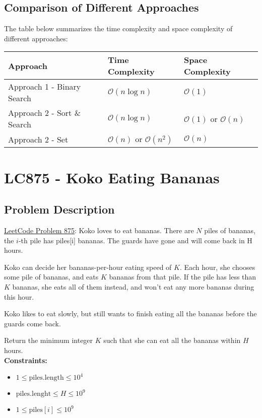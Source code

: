 \documentclass[justified]{tufte-book}
\begin{document}
\subsection{Comparison of Different Approaches}
The table below summarizes the time complexity and space complexity of different approaches:
\begin{table}[ht]
  \centering
  \begin{tabular}{p{5cm}ll}
    \toprule
    Approach & Time Complexity & Space Complexity \\
    \midrule
    Approach 1 - Binary Search &  $\mathcal{O}(n\log n)$ & $\mathcal{O}(1)$\\
    Approach 2 - Sort \& Search &  $\mathcal{O}(n \log{n})$ & $\mathcal{O}(1)$ or $\mathcal{O}(n)$\\
    Approach 2 - Set &  $\mathcal{O}(n)$ or $\mathcal{O}(n^2)$ & $\mathcal{O}(n)$\\
    \bottomrule
  \end{tabular}
\end{table}

\section{LC875 - Koko Eating Bananas}
\subsection{Problem Description}
\href{https://leetcode.com/problems/koko-eating-bananas/}{LeetCode Problem 875}: Koko loves to eat bananas.  There are $N$ piles of bananas, the $i$-th pile has piles[i] bananas.  The guards have gone and will come back in H hours.

Koko can decide her bananas-per-hour eating speed of $K$.  Each hour, she chooses some pile of bananas, and eats $K$ bananas from that pile.  If the pile has less than $K$ bananas, she eats all of them instead, and won't eat any more bananas during this hour.

Koko likes to eat slowly, but still wants to finish eating all the bananas before the guards come back.

Return the minimum integer $K$ such that she can eat all the bananas within $H$ hours. \\

\noindent \textbf{Constraints:}
\begin{itemize}
    \item $1 \leq \text{piles.length} \leq 10^4$
    \item $\text{piles.lenght} \leq H \leq 10^9$
    \item $1 \leq \text{piles}[i] \leq 10^9$
\end{itemize} 
\end{document}
